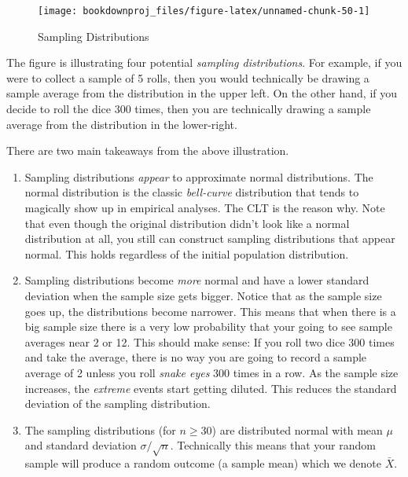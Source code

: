 \documentclass[
]{book}
\begin{document}
\begin{figure}

{\centering \texttt{[image: bookdownproj\_files/figure-latex/unnamed-chunk-50-1]} 

}

\caption{Sampling Distributions}\label{fig:unnamed-chunk-50}
\end{figure}

The figure is illustrating four potential \emph{sampling distributions}. For example, if you were to collect a sample of 5 rolls, then you would technically be drawing a sample average from the distribution in the upper left. On the other hand, if you decide to roll the dice 300 times, then you are technically drawing a sample average from the distribution in the lower-right.

There are two main takeaways from the above illustration.

\begin{enumerate}
\def\labelenumi{\arabic{enumi}.}
\item
  Sampling distributions \emph{appear} to approximate normal distributions. The normal distribution is the classic \emph{bell-curve} distribution that tends to magically show up in empirical analyses. The CLT is the reason why. Note that even though the original distribution didn't look like a normal distribution at all, you still can construct sampling distributions that appear normal. This holds regardless of the initial population distribution.
\item
  Sampling distributions become \emph{more} normal and have a lower standard deviation when the sample size gets bigger. Notice that as the sample size goes up, the distributions become narrower. This means that when there is a big sample size there is a very low probability that your going to see sample averages near 2 or 12. This should make sense: If you roll two dice 300 times and take the average, there is no way you are going to record a sample average of 2 unless you roll \emph{snake eyes} 300 times in a row. As the sample size increases, the \emph{extreme} events start getting diluted. This reduces the standard deviation of the sampling distribution.
\item
  The sampling distributions (for \(n \geq 30\)) are distributed normal with mean \(\mu\) and standard deviation \(\sigma / \sqrt{n}\). Technically this means that your random sample will produce a random outcome (a sample mean) which we denote \(\bar{X}\).
\end{enumerate}
\end{document}
